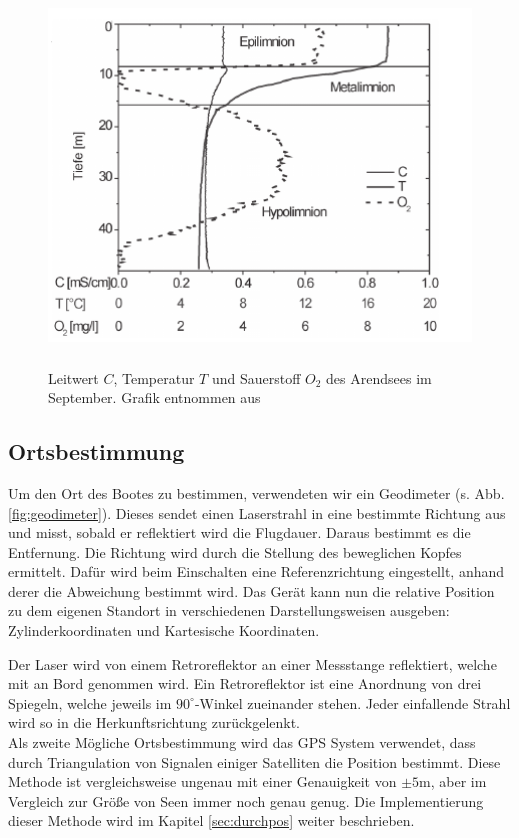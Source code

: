\documentclass[12pt,a4paper,titlepage,headinclude,bibtotoc]{scrartcl}
\numberwithin{equation}{subsection}
\begin{document}
\begin{figure}[h]
	\centering
	\includegraphics[height=10cm]{schicht.png}
	\caption{Leitwert $C$, Temperatur $T$ und Sauerstoff $O_2$ des Arendsees im September. Grafik entnommen aus \cite{schicht} }
	\label{fig:schichtung}
\end{figure}



\subsection{Ortsbestimmung}
\label{sec:theoort}
Um den Ort des Bootes zu bestimmen, verwendeten wir ein Geodimeter (s. Abb. \ref{fig:geodimeter}).
Dieses sendet einen Laserstrahl in eine bestimmte Richtung aus und misst, sobald er reflektiert wird die Flugdauer.
Daraus bestimmt es die Entfernung.
Die Richtung wird durch die Stellung des beweglichen Kopfes ermittelt.
Dafür wird beim Einschalten eine Referenzrichtung eingestellt, anhand derer die Abweichung bestimmt wird.
Das Gerät kann nun die relative Position zu dem eigenen Standort in verschiedenen Darstellungsweisen ausgeben: Zylinderkoordinaten und Kartesische Koordinaten.

Der Laser wird von einem Retroreflektor an einer Messstange reflektiert, welche mit an Bord genommen wird.
Ein Retroreflektor ist eine Anordnung von drei Spiegeln, welche jeweils im $90^\circ$-Winkel zueinander stehen.
Jeder einfallende Strahl wird so in die Herkunftsrichtung zurückgelenkt.\\
Als zweite Mögliche Ortsbestimmung wird das GPS System verwendet, dass durch Triangulation von Signalen einiger Satelliten die Position bestimmt.
Diese Methode ist vergleichsweise ungenau mit einer Genauigkeit von $\pm5\si{\meter}$, aber im Vergleich zur Größe von Seen immer noch genau genug.
Die Implementierung dieser Methode wird im Kapitel \ref{sec:durchpos} weiter beschrieben.
\end{document}
